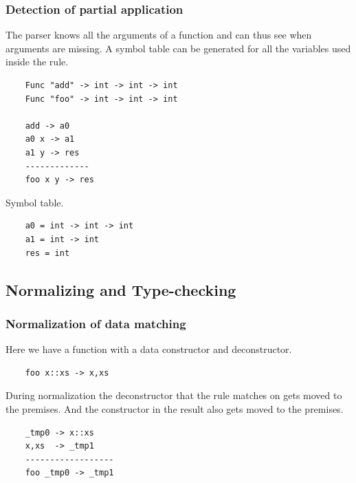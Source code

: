 \begin{frame}[fragile]
    \frametitle{Detection of partial application}
    The parser knows all the arguments of a function and can thus see when arguments are missing.
    A symbol table can be generated for all the variables used inside the rule.

    \begin{lstlisting}
    Func "add" -> int -> int -> int
    Func "foo" -> int -> int -> int

    add -> a0
    a0 x -> a1
    a1 y -> res
    -------------
    foo x y -> res
    \end{lstlisting}

    Symbol table.
    \begin{lstlisting}
    a0 = int -> int -> int
    a1 = int -> int
    res = int
    \end{lstlisting}
\end{frame}

\subsection{Normalizing and Type-checking}



\begin{frame}[fragile]
    \frametitle{Normalization of data matching}
    Here we have a function with a data constructor and deconstructor.
    \begin{lstlisting}
    foo x::xs -> x,xs
    \end{lstlisting}
    During normalization the deconstructor that the rule matches on gets moved to the premises.
    And the constructor in the result also gets moved to the premises.
    \begin{lstlisting}
    _tmp0 -> x::xs
    x,xs  -> _tmp1
    ------------------
    foo _tmp0 -> _tmp1
    \end{lstlisting}
\end{frame}

